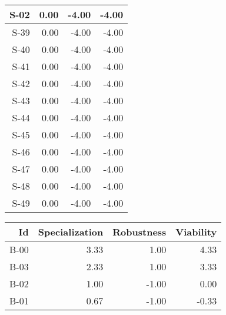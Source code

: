 \begin{tabular}{ | r | r | r | r | }
    \hline
                  S-02  &            0.00  &           -4.00  &           -4.00  \\
    \hline
                  S-39  &            0.00  &           -4.00  &           -4.00  \\
    \hline
                  S-40  &            0.00  &           -4.00  &           -4.00  \\
    \hline
                  S-41  &            0.00  &           -4.00  &           -4.00  \\
    \hline
                  S-42  &            0.00  &           -4.00  &           -4.00  \\
    \hline
                  S-43  &            0.00  &           -4.00  &           -4.00  \\
    \hline
                  S-44  &            0.00  &           -4.00  &           -4.00  \\
    \hline
                  S-45  &            0.00  &           -4.00  &           -4.00  \\
    \hline
                  S-46  &            0.00  &           -4.00  &           -4.00  \\
    \hline
                  S-47  &            0.00  &           -4.00  &           -4.00  \\
    \hline
                  S-48  &            0.00  &           -4.00  &           -4.00  \\
    \hline
                  S-49  &            0.00  &           -4.00  &           -4.00  \\
    \hline
\end{tabular}


\begin{tabular}{ | r | r | r | r | }
    \hline
                    Id  &  Specialization  &      Robustness  &       Viability  \\
    \hline
    \hline
                  B-00  &            3.33  &            1.00  &            4.33  \\
    \hline
                  B-03  &            2.33  &            1.00  &            3.33  \\
    \hline
                  B-02  &            1.00  &           -1.00  &            0.00  \\
    \hline
                  B-01  &            0.67  &           -1.00  &           -0.33  \\
    \hline
\end{tabular}


